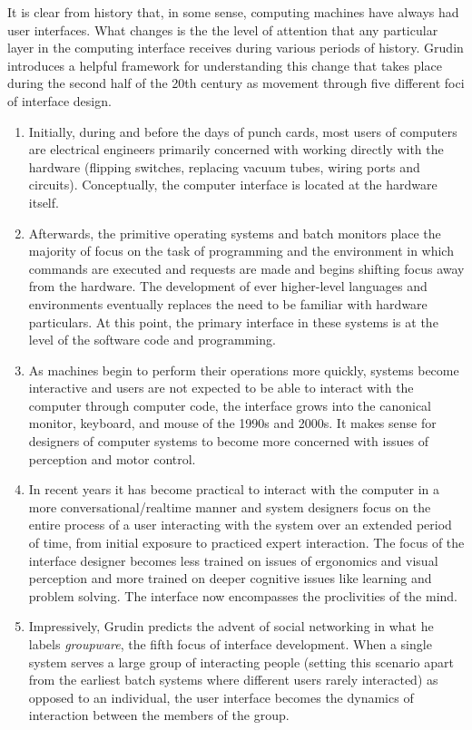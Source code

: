 It is clear from history that, in some sense, computing machines have always had user interfaces. What changes is the the level of attention that any particular layer in the computing interface receives during various periods of history. Grudin \cite{continuity1990} introduces a helpful framework for understanding this change that takes place during the second half of the 20th century as movement through five different foci of interface design. 

\begin{enumerate}
\item Initially, during and before the days of punch cards, most users of computers are electrical engineers primarily concerned with working directly with the hardware (flipping switches, replacing vacuum tubes, wiring ports and circuits). Conceptually, the computer interface is located at the hardware itself. 

\item Afterwards, the primitive operating systems and batch monitors place the majority of focus on the task of programming and the environment in which commands are executed and requests are made and begins shifting focus away from the hardware. The development of ever higher-level languages and environments eventually replaces the need to be familiar with hardware particulars. At this point, the primary interface in these systems is at the level of the software code and programming. 

\item As machines begin to perform their operations more quickly, systems become interactive and users are not expected to be able to interact with the computer through computer code, the interface grows into the canonical monitor, keyboard, and mouse of the 1990s and 2000s. It makes sense for designers of computer systems to become more concerned with issues of perception and motor control. 

\item In recent years it has become practical to interact with the computer in a more conversational/realtime manner and system designers focus on the entire process of a user interacting with the system over an extended period of time, from initial exposure to practiced expert interaction. The focus of the interface designer becomes less trained on issues of ergonomics and visual perception and more trained on deeper cognitive issues like learning and problem solving. The interface now encompasses the proclivities of the mind. 

\item Impressively, Grudin predicts the advent of social networking in what he labels \emph{groupware}, the fifth focus of interface development. When a single system serves a large group of interacting people (setting this scenario apart from the earliest batch systems where different users rarely interacted) as opposed to an individual, the user interface becomes the dynamics of interaction between the members of the group.
\end{enumerate}


